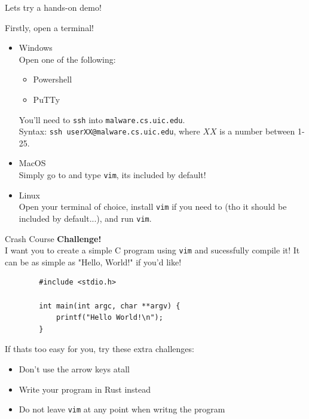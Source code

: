 \documentclass{beamer}
\begin{document}
\begin{frame}
	Lets try a hands-on demo!
	\pause

	Firstly, open a terminal!
	\begin{itemize}
		\item Windows\\
			Open one of the following:
			\begin{itemize}
				\item Powershell
				\item PuTTy
			\end{itemize}
			You'll need to \texttt{ssh} into
			\texttt{malware.cs.uic.edu}.\\
			Syntax: \texttt{ssh userXX@malware.cs.uic.edu}, where
			$XX$ is a number between 1-25.
		\item MacOS\\
			Simply go to  and
			type \texttt{vim}, its included by default!
		\item Linux\\
			Open your terminal of choice, install \texttt{vim} if
			you need to (tho it should be included by default...),
			and run \texttt{vim}.
	\end{itemize}
\end{frame}

\begin{frame}[fragile]{Crash Course}
	\textbf{Challenge!}\\
	I want you to create a simple C program using \texttt{vim} and
	sucessfully compile it! It can be as simple as "Hello, World!" if you'd
	like!

	\begin{verbatim}
		#include <stdio.h>

		int main(int argc, char **argv) {
			printf("Hello World!\n");
		}
	\end{verbatim}

	If thats too easy for you, try these extra challenges:
	\begin{itemize}
		\item Don't use the arrow keys atall
		\item Write your program in Rust instead
		\item Do not leave \texttt{vim} at any point when writng the
			program
	\end{itemize}
\end{frame}
\end{document}
